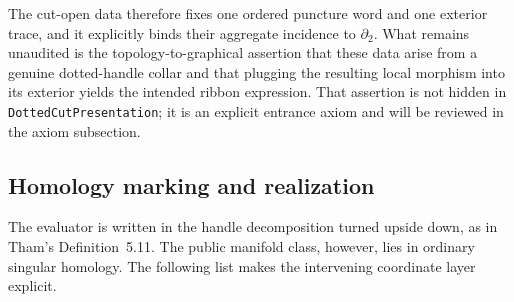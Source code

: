 The cut-open data therefore fixes one ordered puncture word and one exterior
trace, and it explicitly binds their aggregate incidence to $\partial_2$.
What remains unaudited is the topology-to-graphical assertion that these data
arise from a genuine dotted-handle collar and that plugging the resulting
local morphism into its exterior yields the intended ribbon expression.  That
assertion is not hidden in \texttt{DottedCutPresentation}; it is an explicit
entrance axiom and will be reviewed in the axiom subsection.

\subsection{Homology marking and realization}
\label{app:lean-homology-marking}

The evaluator is written in the handle decomposition turned upside down, as
in Tham's Definition~5.11.  The public manifold class, however, lies in
ordinary singular homology.  The following list makes the intervening
coordinate layer explicit.

